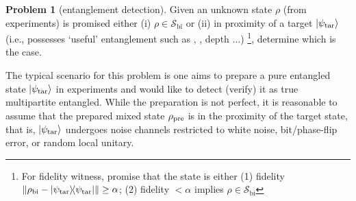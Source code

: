 \documentclass[
aps,
pra,
twocolumn,
floatfix,
]{revtex4-2}
\theoremstyle{plain}
\theoremstyle{definition}
\newtheorem{problem}{Problem}
\newcommand{\dm}{\rho}
\newcommand{\bi}{\text{bi}}
\newcommand{\target}{\textup{tar}}
\newcommand{\prepare}{\textup{pre}}
\newcommand{\separable}{\mathcal{S}}
\newcommand{\ppartition}{\mathcal{P}}
\begin{document}
\begin{problem}[entanglement detection]\label{prm:entanglement_detection}
	Given an unknown state $\dm$ (from experiments) is promised either (i) $\dm\in\separable_{\bi}$
	or (ii) in proximity of a target $\ket{\psi_{\target}}$ (i.e., possesses `useful' entanglement such as , , depth ...) 
	\footnote{
		For fidelity witness, promise that the state is either 
		(1) fidelity $\norm{\dm_{\bi}-\op{\psi_\target}}\ge \alpha$; 
		(2) fidelity $< \alpha$ implies $\dm\in\separable_{\bi}$
	},
	determine which is the case.
\end{problem}
The typical scenario for this problem is one aims to prepare a pure entangled state $\ket{\psi_\target}$ in experiments and would like to detect (verify) it as true multipartite entangled. 
While the preparation is not perfect, 
it is reasonable to assume that the prepared mixed state $\dm_{\prepare}$ is in the proximity of the target state,
that is, $\ket{\psi_{\target}}$ undergoes noise channels restricted to white noise, bit/phase-flip error, or random local unitary.
\end{document}
